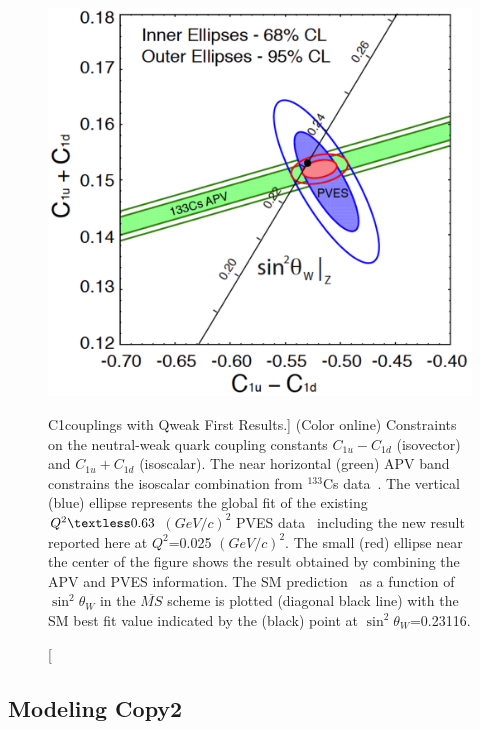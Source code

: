 \begin{singlespace}
\begin{figure}[!h]
	\begin{center}
	\includegraphics[width=12.0cm]{figures/qweakQuarkCouplings}
	\end{center}
	\caption
	[C1couplings with Qweak First Results.]
	{(Color online) Constraints on the neutral-weak quark coupling constants {$C_{1u}- C_{1d}$} (isovector) and {$C_{1u} + C_{1d}$} (isoscalar). The near horizontal (green) APV band constrains the isoscalar combination from $^{133}$Cs data~\cite{PhysRevLett.109.203003, Wood21031997}. The vertical (blue) ellipse  represents the global fit of the existing $Q^2 \textless 0.63$ $(GeV/c)^{2}$ PVES data~\cite{PhysRevC.69.065501, PhysRevLett.82.1096, PhysRevLett.96.022003, Aniol2006275, PhysRevLett.98.032301, PhysRevLett.108.102001, Spayde200479, PhysRevLett.92.102003, PhysRevLett.95.092001, PhysRevLett.104.012001, PhysRevLett.93.022002, PhysRevLett.94.152001, PhysRevLett.102.151803, PhysRevD.86.010001, PhysRevLett.109.203003, Wood21031997, PhysRevLett.111.141803} including the new result reported here at $Q^{2}$=0.025 $(GeV/c)^{2}$. The small (red) ellipse near the center of the figure shows the result obtained by combining the APV and PVES information. The SM prediction~\cite{PhysRevD.86.010001} as a function of $\sin^{2}\theta_W $ in the $\overline{MS}$ scheme is plotted (diagonal black line) with the SM best fit value indicated by the (black) point at $\sin^{2}\theta_W $=0.23116.}
	\label{fig:qweakQuarkCouplings}
\end{figure}
\end{singlespace}


\subsection{Modeling Copy2}
